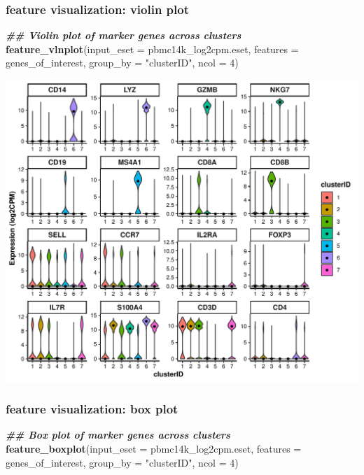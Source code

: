 \documentclass[
  12pt,
]{book}
\newenvironment{Shaded}{\begin{snugshade}}{\end{snugshade}}
\newcommand{\AttributeTok}[1]{\textcolor[rgb]{0.13,0.29,0.53}{#1}}
\newcommand{\DecValTok}[1]{\textcolor[rgb]{0.00,0.00,0.81}{#1}}
\newcommand{\DocumentationTok}[1]{\textcolor[rgb]{0.56,0.35,0.01}{\textbf{\textit{#1}}}}
\newcommand{\FunctionTok}[1]{\textcolor[rgb]{0.13,0.29,0.53}{\textbf{#1}}}
\newcommand{\NormalTok}[1]{#1}
\newcommand{\StringTok}[1]{\textcolor[rgb]{0.31,0.60,0.02}{#1}}
\begin{document}
\subsubsection{feature visualization: violin plot}\label{feature-visualization-violin-plot}

\begin{Shaded}
\begin{Highlighting}[]
\DocumentationTok{\#\# Violin plot of marker genes across clusters}
\FunctionTok{feature\_vlnplot}\NormalTok{(}\AttributeTok{input\_eset =}\NormalTok{ pbmc14k\_log2cpm.eset, }\AttributeTok{features =}\NormalTok{ genes\_of\_interest, }\AttributeTok{group\_by =} \StringTok{"clusterID"}\NormalTok{, }\AttributeTok{ncol =} \DecValTok{4}\NormalTok{)}
\end{Highlighting}
\end{Shaded}

\begin{center}\includegraphics{_main_files/figure-latex/featurePlot-vln-1} \end{center}

\subsubsection{feature visualization: box plot}\label{feature-visualization-box-plot}

\begin{Shaded}
\begin{Highlighting}[]
\DocumentationTok{\#\# Box plot of marker genes across clusters}
\FunctionTok{feature\_boxplot}\NormalTok{(}\AttributeTok{input\_eset =}\NormalTok{ pbmc14k\_log2cpm.eset, }\AttributeTok{features =}\NormalTok{ genes\_of\_interest, }\AttributeTok{group\_by =} \StringTok{"clusterID"}\NormalTok{, }\AttributeTok{ncol =} \DecValTok{4}\NormalTok{)}
\end{Highlighting}
\end{Shaded}
\end{document}
